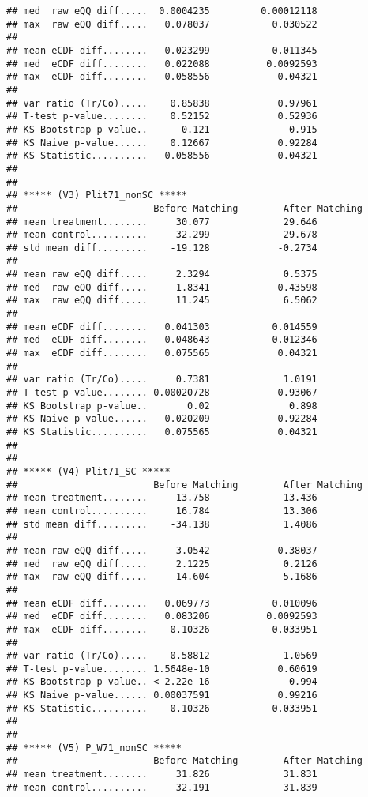 \documentclass[
]{article}
\begin{document}
\begin{verbatim}
## med  raw eQQ diff.....  0.0004235         0.00012118 
## max  raw eQQ diff.....   0.078037           0.030522 
## 
## mean eCDF diff........   0.023299           0.011345 
## med  eCDF diff........   0.022088          0.0092593 
## max  eCDF diff........   0.058556            0.04321 
## 
## var ratio (Tr/Co).....    0.85838            0.97961 
## T-test p-value........    0.52152            0.52936 
## KS Bootstrap p-value..      0.121              0.915 
## KS Naive p-value......    0.12667            0.92284 
## KS Statistic..........   0.058556            0.04321 
## 
## 
## ***** (V3) Plit71_nonSC *****
##                        Before Matching        After Matching
## mean treatment........     30.077             29.646 
## mean control..........     32.299             29.678 
## std mean diff.........    -19.128            -0.2734 
## 
## mean raw eQQ diff.....     2.3294             0.5375 
## med  raw eQQ diff.....     1.8341            0.43598 
## max  raw eQQ diff.....     11.245             6.5062 
## 
## mean eCDF diff........   0.041303           0.014559 
## med  eCDF diff........   0.048643           0.012346 
## max  eCDF diff........   0.075565            0.04321 
## 
## var ratio (Tr/Co).....     0.7381             1.0191 
## T-test p-value........ 0.00020728            0.93067 
## KS Bootstrap p-value..       0.02              0.898 
## KS Naive p-value......   0.020209            0.92284 
## KS Statistic..........   0.075565            0.04321 
## 
## 
## ***** (V4) Plit71_SC *****
##                        Before Matching        After Matching
## mean treatment........     13.758             13.436 
## mean control..........     16.784             13.306 
## std mean diff.........    -34.138             1.4086 
## 
## mean raw eQQ diff.....     3.0542            0.38037 
## med  raw eQQ diff.....     2.1225             0.2126 
## max  raw eQQ diff.....     14.604             5.1686 
## 
## mean eCDF diff........   0.069773           0.010096 
## med  eCDF diff........   0.083206          0.0092593 
## max  eCDF diff........    0.10326           0.033951 
## 
## var ratio (Tr/Co).....    0.58812             1.0569 
## T-test p-value........ 1.5648e-10            0.60619 
## KS Bootstrap p-value.. < 2.22e-16              0.994 
## KS Naive p-value...... 0.00037591            0.99216 
## KS Statistic..........    0.10326           0.033951 
## 
## 
## ***** (V5) P_W71_nonSC *****
##                        Before Matching        After Matching
## mean treatment........     31.826             31.831 
## mean control..........     32.191             31.839 

\end{verbatim}
\end{document}
